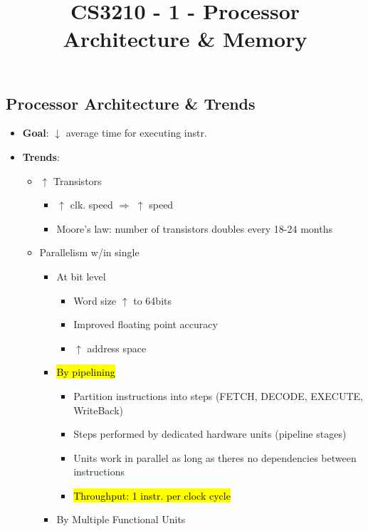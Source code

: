 \documentclass[12pt]{article}
\title{\textbf{CS3210 - 1 - Processor Architecture \& Memory}}
\date{}
\begin{document}
\maketitle

\begin{spacing}{1.5}

\section{Processor Architecture \& Trends}

\begin{itemize}
	\item \textbf{Goal}: $\downarrow$ average time for executing instr.
	\item \textbf{Trends}:
		\begin{itemize}
			\item $\uparrow$ Transistors
				\begin{itemize}
					\item $\uparrow$ clk. speed $\Rightarrow$ $\uparrow$ speed
					\item Moore's law: number of transistors doubles every 18-24 months
				\end{itemize}
			\item Parallelism w/in single 
				\begin{itemize}
					\item At bit level
						\begin{itemize}
							\item Word size $\uparrow$ to 64bits
							\item Improved floating point accuracy
							\item $\uparrow$ address space
						\end{itemize}
					\item \hl{By pipelining}
						\begin{itemize}
							\item Partition instructions into steps (FETCH, DECODE, EXECUTE, WriteBack)
							\item Steps performed by dedicated hardware units (pipeline stages)
							\item Units work in parallel as long as theres no dependencies between instructions
							\item \hl{Throughput: 1 instr. per clock cycle}
						\end{itemize}
					\item By Multiple Functional Units
						\begin{itemize}

\end{itemize}
\end{itemize}
\end{itemize}
\end{itemize}
\end{spacing}
\end{document}
